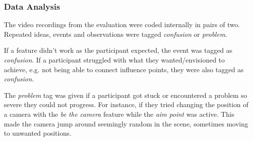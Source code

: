 \subsubsection{Data Analysis}
The video recordings from the evaluation were coded internally in pairs of two. Repeated ideas, events and observations were tagged \textit{confusion} or \textit{problem}.

If a feature didn't work as the participant expected, the event was tagged as \textit{confusion}. If a participant struggled with what they wanted/envisioned to achieve, e.g. not being able to connect influence points, they were also tagged as \textit{confusion}.

The \textit{problem} tag was given if a participant got stuck or encountered a problem so severe they could not progress. For instance, if they tried changing the position of a camera with the \textit{be the camera} feature while the \textit{aim point} was active. This made the camera jump around seemingly random in the scene, sometimes moving to unwanted positions.

